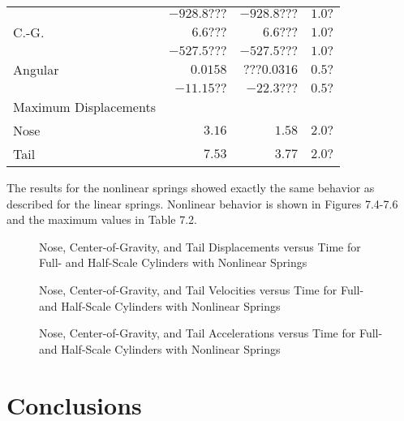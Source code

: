 \begin{table}
\begin{center}
\begin{tabular}{||l|r|r|r||}
         &$-928.8???$ &$-928.8???$ &$1.0?$\\
\quad   C.-G. &$6.6???$ &$6.6???$ &$1.0?$\\
         &$-527.5???$ &$-527.5???$ &$1.0?$\\
\quad Angular &$0.0158$ &$???0.0316$ &$0.5?$\\
         &$-11.15??$ &$-22.3???$ &$0.5?$\\
Maximum Displacements & & & \\
\quad    Nose &$3.16$ &$1.58$ &$2.0?$\\
\quad    Tail &$7.53$ &$3.77$ &$2.0?$\\
\hline
\end{tabular}
\end{center}
\end{table}

     The results for the nonlinear springs showed exactly the same
behavior as described for the linear springs.  Nonlinear behavior is
shown in Figures 7.4-7.6 and the maximum values in Table 7.2.

\begin{figure}
\vspace{3.5 in}
\caption{Nose, Center-of-Gravity, and Tail Displacements versus Time
for Full- and Half-Scale Cylinders with Nonlinear Springs}
\end{figure}

\begin{figure}
\vspace{3.5 in}
\caption{Nose, Center-of-Gravity, and Tail Velocities versus Time
for Full- and Half-Scale Cylinders with Nonlinear Springs}
\end{figure}

\begin{figure}
\vspace{3.5 in}
\caption{Nose, Center-of-Gravity, and Tail Accelerations versus Time
for Full- and Half-Scale Cylinders with Nonlinear Springs}
\end{figure}

\section{Conclusions}

